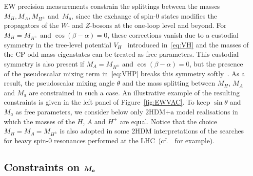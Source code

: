 \documentclass[a4paper, 11pt,notoc]{article}
\newcommand{\hdma}{\ensuremath{\textrm{2HDM+a}}\xspace}
\def\bm#1{\mbox{\boldmath$#1$\unboldmath}}
\begin{document}
EW precision measurements constrain the splittings between the masses $M_H, M_A, M_{H^\pm}$ and~$M_a$, since the exchange of spin-0 states modifies the propagators of the $W$- and $Z$-bosons at the one-loop level and beyond. For $M_H=M_{H^\pm}$ and $\cos(\beta-\alpha)=0$, these corrections vanish due to a custodial symmetry in the tree-level potential $V_H$~\cite{Haber:1992py,Pomarol:1993mu,Gerard:2007kn,Grzadkowski:2010dj,Haber:2010bw} introduced in~\eqref{eq:VH} and the masses of the CP-odd mass eigenstates can be treated as free parameters. This custodial symmetry is also present if $M_A=M_{H^\pm}$ and $\cos(\beta-\alpha)=0$, but the presence of the pseudoscalar mixing term in~\eqref{eq:VHP}  breaks this symmetry softly~\cite{Bauer:2017ota}. As a result, the pseudoscalar mixing angle $\theta$ and the mass splitting between $M_H$, $M_A$ and $M_a$ are constrained in such a case. An illustrative example of the resulting constraints is given in the left panel of Figure~\ref{fig:EWVAC}. To keep $\sin \theta$ and $M_a$ as free parameters, we consider below only \hdma model realisations in which the masses of the $H$, $A$ and $H^\pm$ are equal. Notice that the choice $M_H = M_A = M_{H^\pm}$ is also adopted  in some 2HDM interpretations of the searches for heavy spin-0 resonances performed at the LHC~(cf.~\cite{Aaboud:2017gsl,Aaboud:2017rel,Sirunyan:2018taj}~for example). 

\subsection*{Constraints on $\bm{M_a}$}
\end{document}
